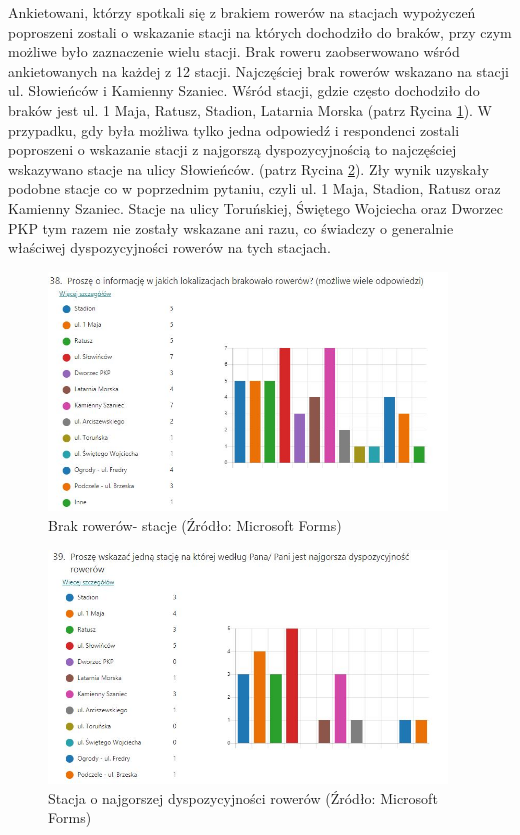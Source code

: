 \documentclass{amuthesis}
\begin{document}
Ankietowani, którzy spotkali się z brakiem rowerów na stacjach wypożyczeń poproszeni zostali o wskazanie stacji na których dochodziło do braków, przy czym możliwe było zaznaczenie wielu stacji.
Brak roweru zaobserwowano wśród ankietowanych na każdej z 12 stacji.
Najczęściej brak rowerów wskazano na stacji ul. Słowieńców i Kamienny Szaniec.
Wśród stacji, gdzie często dochodziło do braków jest ul. 1 Maja, Ratusz, Stadion, Latarnia Morska (patrz Rycina \ref{fig:ankieta38}).
W przypadku, gdy była możliwa tylko jedna odpowiedź i respondenci zostali poproszeni o wskazanie stacji z najgorszą dyspozycyjnością to najczęściej wskazywano stacje na ulicy Słowieńców. (patrz Rycina \ref{fig:ankieta39}).
Zły wynik uzyskały podobne stacje co w poprzednim pytaniu, czyli ul. 1 Maja, Stadion, Ratusz oraz Kamienny Szaniec.
Stacje na ulicy Toruńskiej, Świętego Wojciecha oraz Dworzec PKP tym razem nie zostały wskazane ani razu, co świadczy o generalnie właściwej dyspozycyjności rowerów na tych stacjach.

\begin{figure}[t]

{\centering \includegraphics[width=400px]{figures/ankieta/38} 

}

\caption{Brak rowerów- stacje (Źródło: Microsoft Forms)}\label{fig:ankieta38}
\end{figure}

\begin{figure}[t]

{\centering \includegraphics[width=400px]{figures/ankieta/39} 

}

\caption{Stacja o najgorszej dyspozycyjności rowerów (Źródło: Microsoft Forms)}\label{fig:ankieta39}
\end{figure}
\end{document}
